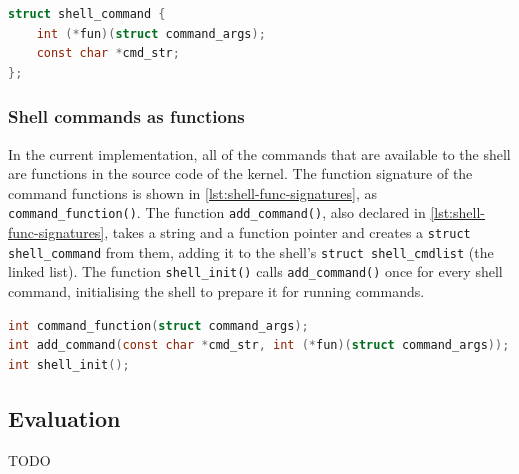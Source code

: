 \documentclass{article}
\begin{document}
\begin{lstlisting}[language=C,
                   caption={The definition of the \texttt{shell\_command}
                   struct},
                   label={lst:struct-shell-command}]
struct shell_command {
    int (*fun)(struct command_args);
    const char *cmd_str;
};
\end{lstlisting}

\subsubsection{Shell commands as functions}
In the current implementation, all of the commands that are available to the
shell are functions in the source code of the kernel. The function signature of
the command functions is shown in \autoref{lst:shell-func-signatures}, as
\verb!command_function()!. The function \verb!add_command()!, also declared in
\autoref{lst:shell-func-signatures}, takes a string and a function pointer and
creates a \verb!struct shell_command! from them, adding it to the shell's
\verb!struct shell_cmdlist! (the linked list). The function \verb!shell_init()!
calls \verb!add_command()! once for every shell command, initialising the shell
to prepare it for running commands.

\begin{lstlisting}[language=C,
                   caption={The signatures of some important functions for the
                   shell},
                   label={lst:shell-func-signatures}]
int command_function(struct command_args);
int add_command(const char *cmd_str, int (*fun)(struct command_args));
int shell_init();
\end{lstlisting}

\subsection{Evaluation}
TODO
\end{document}
